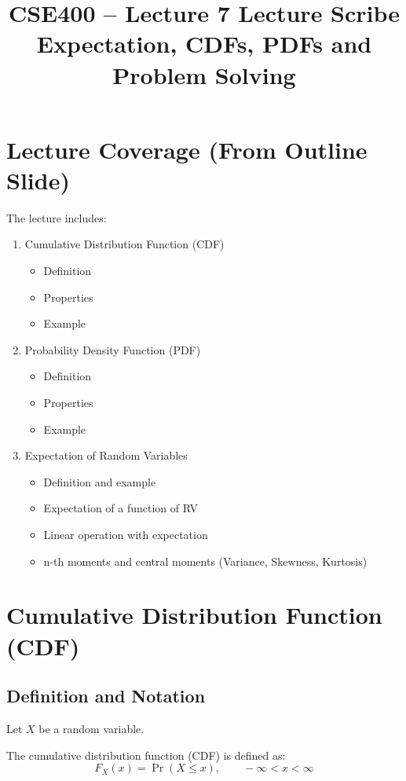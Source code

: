 \documentclass[12pt]{article}
\title{CSE400 -- Lecture 7 Lecture Scribe\\
Expectation, CDFs, PDFs and Problem Solving}
\date{}
\begin{document}
\maketitle

\section{Lecture Coverage (From Outline Slide)}

The lecture includes:

\begin{enumerate}
\item Cumulative Distribution Function (CDF)
\begin{itemize}
\item Definition
\item Properties
\item Example
\end{itemize}

\item Probability Density Function (PDF)
\begin{itemize}
\item Definition
\item Properties
\item Example
\end{itemize}

\item Expectation of Random Variables
\begin{itemize}
\item Definition and example
\item Expectation of a function of RV
\item Linear operation with expectation
\item n-th moments and central moments (Variance, Skewness, Kurtosis)
\end{itemize}
\end{enumerate}

\section{Cumulative Distribution Function (CDF)}

\subsection{Definition and Notation}

Let $X$ be a random variable.

The cumulative distribution function (CDF) is defined as:
\[
F_X(x) = \Pr(X \le x), \qquad -\infty < x < \infty
\]
\end{document}
